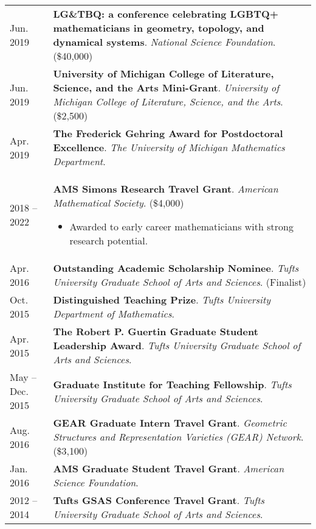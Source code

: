 
    \medskip


    \medskip
    
    \begin{center}
    {
    \renewcommand{\arraystretch}{1.5}
    \begin{longtable}{p{}  p{}}
     Jun.  2019 & \textbf{LG\&TBQ: a conference celebrating LGBTQ+ mathematicians in geometry, topology, and dynamical systems}. \textit{National Science Foundation}. (\$40,000) \\ 
 Jun.  2019 & \textbf{University of Michigan College of Literature, Science, and the Arts Mini-Grant}. \textit{University of Michigan College of Literature, Science, and the Arts}. (\$2,500) \\ 
 Apr.  2019 & \textbf{The Frederick Gehring Award for Postdoctoral Excellence}. \textit{The University of Michigan Mathematics Department}.  \\ 
   2018 --    2022 & \textbf{AMS Simons Research Travel Grant}. \textit{American Mathematical Society}. (\$4,000)
        \hspace{-1em}

        {\small
        \begin{itemize}
        \setlength{\parindent}{0em}
        \item[] Awarded to early career mathematicians with strong research potential.
        \end{itemize}
        }
        \vspace{-1em}
         \\ 
 Apr.  2016 & \textbf{Outstanding Academic Scholarship Nominee}. \textit{Tufts University Graduate School of Arts and Sciences}. (Finalist) \\ 
 Oct.  2015 & \textbf{Distinguished Teaching Prize}. \textit{Tufts University Department of Mathematics}.  \\ 
 Apr.  2015 & \textbf{The Robert P. Guertin Graduate Student Leadership Award}. \textit{Tufts University Graduate School of Arts and Sciences}.  \\ 
 May  --  Dec.  2015 & \textbf{Graduate Institute for Teaching Fellowship}. \textit{Tufts University Graduate School of Arts and Sciences}.  \\ 
 Aug.  2016 & \textbf{GEAR Graduate Intern Travel Grant}. \textit{Geometric Structures and Representation Varieties (GEAR) Network}. (\$3,100) \\ 
 Jan.  2016 & \textbf{AMS Graduate Student Travel Grant}. \textit{American Science Foundation}.  \\ 
   2012 --    2014 & \textbf{Tufts GSAS Conference Travel Grant}. \textit{Tufts University Graduate School of Arts and Sciences}.  
    \end{longtable}
    } 
    \end{center}

    \vspace{-1em}
    